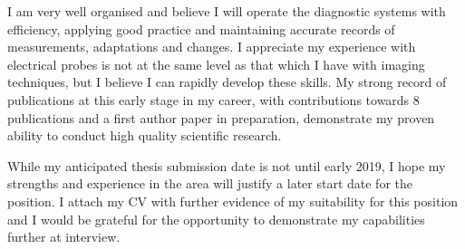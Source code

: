 \documentclass[11pt,a4paper,sans]{moderncv}        %
\begin{document}
I am very well organised and believe I will operate the diagnostic systems with efficiency, applying good practice and maintaining accurate records of measurements, adaptations and changes.
I appreciate my experience with electrical probes is not at the same level as that which I have with imaging techniques, but I believe I can rapidly develop these skills.
My strong record of publications at this early stage in my career, with contributions towards 8 publications and a first author paper in preparation, demonstrate my proven ability to conduct high quality scientific research.

While my anticipated thesis submission date is not until early 2019, I hope my strengths and experience in the area will justify a later start date for the position.
I attach my CV with further evidence of my suitability for this position and I would be grateful for the opportunity to demonstrate my capabilities further at interview. 

\makeletterclosing
\end{document}
